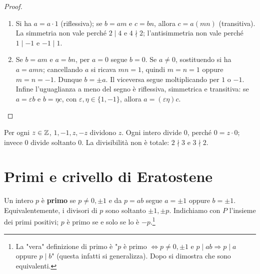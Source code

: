 \begin{proof}
\begin{enumerate}[label=\arabic*.]
\item Si ha $a=a\cdot1$ (riflessiva); se $b=am$ e $c=bn$, allora $c=a(mn)$ (transitiva). La simmetria non vale perché $2\mid4$ e $4\nmid2$; l'antisimmetria non vale perché $1\mid-1$ e $-1\mid1$.
\item Se $b=am$ e $a=bn$, per $a=0$ segue $b=0$. Se $a\ne0$, sostituendo si ha $a=amn$; cancellando $a$ si ricava $mn=1$, quindi $m=n=1$ oppure $m=n=-1$. Dunque $b=\pm a$. Il viceversa segue moltiplicando per $1$ o $-1$. Infine l'uguaglianza a meno del segno è riflessiva, simmetrica e transitiva: se $a=\varepsilon b$ e $b=\eta c$, con $\varepsilon,\eta\in\{1,-1\}$, allora $a=(\varepsilon\eta)c$.
\end{enumerate}
\end{proof}

\begin{osservazione}
Per ogni $z\in\mathbb{Z}$, $1,-1,z,-z$ dividono $z$. Ogni intero divide $0$, perché $0=z\cdot0$; invece $0$ divide soltanto $0$. La divisibilità non è totale: $2\nmid3$ e $3\nmid2$.
\end{osservazione}

\section{Primi e crivello di Eratostene}
\begin{definizione}
Un intero $p$ è \textbf{primo} se $p\ne0,\pm1$ e da $p=ab$ segue $a=\pm1$ oppure $b=\pm1$. Equivalentemente, i divisori di $p$ sono soltanto $\pm1,\pm p$. Indichiamo con $P$ l'insieme dei primi positivi; $p$ è primo se e solo se lo è $-p$.\footnote{La "vera" definizione di primo è "$p$ è primo $\iff p\ne0,\pm1$ e $p\mid ab\Rightarrow p\mid a$ oppure $p\mid b$" (questa infatti si generalizza). Dopo si dimostra che sono equivalenti.}
\end{definizione}

